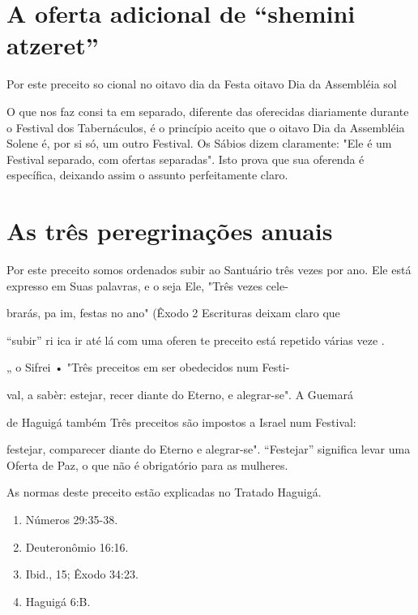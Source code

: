 \section{A oferta adicional de ``shemini atzeret''}

Por este preceito so cional no oitavo dia da Festa oitavo Dia da
Assembléia sol

O que nos faz consi ta em separado, diferente das oferecidas diariamente
durante o Festival dos Ta­bernáculos, é o princípio aceito que o oitavo
Dia da Assembléia Solene é, por si só, um outro Festival. Os Sábios
dizem claramente: "Ele é um Festival separa­do, com ofertas separadas".
Isto prova que sua oferenda é específica, deixando assim o assunto
perfeitamente claro.

\section{As três peregrinações anuais}

Por este preceito somos ordenados subir ao Santuário três vezes por ano.
Ele está expresso em Suas palavras, e o seja Ele, "Três vezes cele-

brarás, pa im, festas no ano" (Êxodo 2 Escrituras deixam claro que

``subir'' ri ica ir até lá com uma oferen te preceito está repetido várias
veze .

„ o Sifrei • "Três preceitos em ser obedecidos num Festi-

val, a sabèr: estejar, recer diante do Eterno, e alegrar-se". A Guemará

de Haguigá também Três preceitos são impostos a Israel num Festival:

festejar, comparecer diante do Eterno e alegrar-se". ``Festejar''
significa levar uma Oferta de Paz, o que não é obrigatório para as
mulheres.

As normas deste preceito estão explicadas no Tratado Haguigá.


\begin{enumerate}
\def\labelenumi{\arabic{enumi}.}
\setcounter{enumi}{66}
\item
 
 Números 29:35-38.
 
\item
 
 Deuteronômio 16:16.
 
\item
 
 Ibid., 15; Êxodo 34:23.
 
\item
 
 Haguigá 6:B.
 
\end{enumerate}

